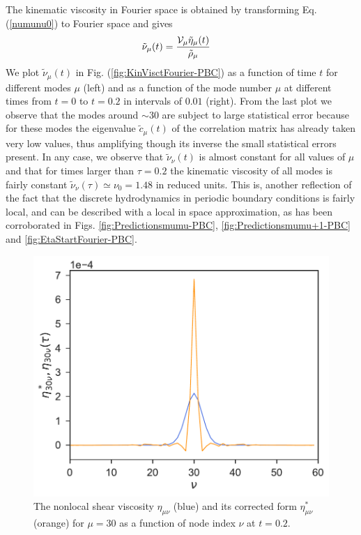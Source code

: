 \documentclass[a4paper,openright,12pt]{book}
\begin{document}
The kinematic viscosity  in Fourier space is  obtained by transforming Eq. (\ref{numunu0})
to Fourier space  and gives
\begin{align}
\tilde{\nu}_\mu(t)&=  \frac{{\cal V}_\mu \tilde{\eta}_\mu(t)}{\tilde{\rho}_\mu}
  \label{kinViscFourier}
\end{align}
We plot $\tilde{\nu}_\mu(t)$  in Fig.  (\ref{fig:KinVisctFourier-PBC}) as a  function of time
$t$ for  different modes  $\mu$ (left)  and as a  function of  the mode
number $\mu$  at different times from $t=0$ to $t=0.2$ in intervals of $0.01$ (right). From
the last plot  we observe that the modes around  $\sim 30$ are subject
to  large statistical  error because  for these  modes the  eigenvalue
$\tilde{c}_\mu(t)$ of  the correlation  matrix has already  taken very
low values, thus  amplifying though its inverse  the small statistical
errors present. In  any case, we observe  that $\tilde{\nu}_\nu(t)$ is
almost constant for all values of $\mu$ and that for times larger than
$\tau=0.2$ the  kinematic viscosity  of all  modes is  fairly constant
$\tilde{\nu}_\nu(\tau)\simeq\nu_0=1.48$  in  reduced units.  This  is,
another reflection  of the  fact that the  discrete hydrodynamics in 
periodic boundary conditions is fairly local, and can be described with
 a local in space approximation, as has been corroborated in Figs. 
 \ref{fig:Predictionsmumu-PBC}, \ref{fig:Predictionsmumu+1-PBC} and \ref{fig:EtaStartFourier-PBC}.


\begin{figure}[h!]
  \centering
\includegraphics[scale=0.45]{CompareEtas-PBC}
\caption[Comparison $\eta^*_{30,\nu}$ and $eta_{30,\nu}$]{The nonlocal shear viscosity $\eta_{\mu\nu}$ (blue) and its corrected form $\eta^*_{\mu\nu}$ (orange) for $\mu=30$ as a function of node index $\nu$ at $t=0.2$.}
\label{fig:CompareEtas-PBC}
\end{figure}
\end{document}
